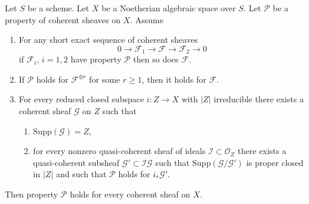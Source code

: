 \begin{lemma}
\label{lemma-property-higher-rank-cohomological}
Let $S$ be a scheme. Let $X$ be a Noetherian algebraic space over $S$.
Let $\mathcal{P}$ be a property of coherent sheaves on $X$. Assume
\begin{enumerate}
\item For any short exact sequence of coherent sheaves
$$
0 \to \mathcal{F}_1 \to \mathcal{F} \to \mathcal{F}_2 \to 0
$$
if $\mathcal{F}_i$, $i = 1, 2$ have property $\mathcal{P}$
then so does $\mathcal{F}$.
\item If $\mathcal{P}$ holds for $\mathcal{F}^{\oplus r}$ for
some $r \geq 1$, then it holds for $\mathcal{F}$.
\item For every reduced closed subspace $i : Z \to X$ with
$|Z|$ irreducible there exists a coherent sheaf $\mathcal{G}$ on $Z$
such that
\begin{enumerate}
\item $\text{Supp}(\mathcal{G}) = Z$,
\item for every nonzero quasi-coherent sheaf of ideals
$\mathcal{I} \subset \mathcal{O}_Z$ there exists a quasi-coherent
subsheaf $\mathcal{G}' \subset \mathcal{I}\mathcal{G}$ such that
$\text{Supp}(\mathcal{G}/\mathcal{G}')$ is proper closed in $|Z|$
and such that $\mathcal{P}$ holds for $i_*\mathcal{G}'$.
\end{enumerate}
\end{enumerate}
Then property $\mathcal{P}$ holds for every coherent sheaf on $X$.
\end{lemma}

